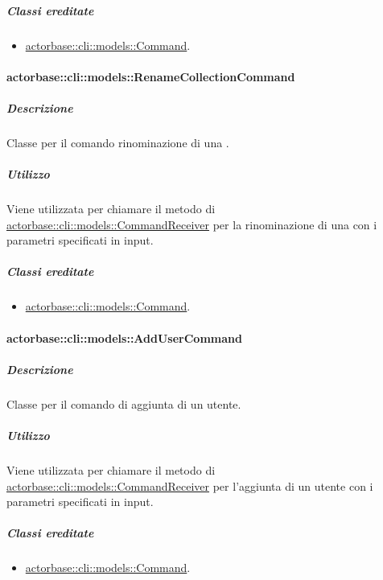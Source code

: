 \documentclass{scalatekids-article}
\begin{document}
\subparagraph{Classi ereditate}

\begin{itemize}
\item \hyperref[sec:actorbase::cli::models::Command]{actorbase::cli::models::Command}.
\end{itemize}

\paragraph{actorbase::cli::models::RenameCollectionCommand}
\label{sec:actorbase::cli::models::RenameCollectionCommand}

\subparagraph{Descrizione}

Classe per il comando rinominazione di una .

\subparagraph{Utilizzo}

Viene utilizzata per chiamare il metodo di \hyperref[sec:actorbase::cli::models::CommandReceiver]{actorbase::cli::models::CommandReceiver} per la rinominazione di una  con i parametri specificati in input.

\subparagraph{Classi ereditate}

\begin{itemize}
\item \hyperref[sec:actorbase::cli::models::Command]{actorbase::cli::models::Command}.
\end{itemize}

\paragraph{actorbase::cli::models::AddUserCommand}
\label{sec:actorbase::cli::models::AddUserCommand}

\subparagraph{Descrizione}

Classe per il comando di aggiunta di un utente.

\subparagraph{Utilizzo}

Viene utilizzata per chiamare il metodo di
\hyperref[sec:actorbase::cli::models::CommandReceiver]{actorbase::cli::models::CommandReceiver} per l'aggiunta di un utente con i
parametri specificati in input.

\subparagraph{Classi ereditate}

\begin{itemize}
\item \hyperref[sec:actorbase::cli::models::Command]{actorbase::cli::models::Command}.
\end{itemize}
\end{document}
